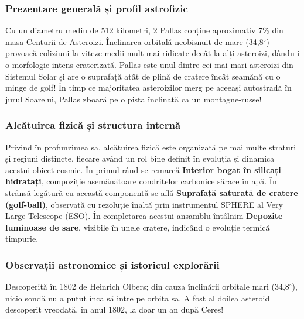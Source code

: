 \subsubsection*{Prezentare generală și profil astrofizic}
Cu un diametru mediu de 512 kilometri, 2 Pallas conține aproximativ 7\% din masa Centurii de Asteroizi. Înclinarea orbitală neobișnuit de mare (34,8$^\circ$) provoacă coliziuni la viteze medii mult mai ridicate decât la alți asteroizi, dându-i o morfologie intens craterizată. Pallas este unul dintre cei mai mari asteroizi din Sistemul Solar și are o suprafață atât de plină de cratere încât seamănă cu o minge de golf! În timp ce majoritatea asteroizilor merg pe aceeași \guillemotleft{}autostradă\guillemotright{} în jurul Soarelui, Pallas zboară pe o pistă înclinată ca un montagne-russe!

\subsubsection*{Alcătuirea fizică și structura internă}
Privind în profunzimea sa, alcătuirea fizică este organizată pe mai multe straturi și regiuni distincte, fiecare având un rol bine definit în evoluția și dinamica acestui obiect cosmic. În primul rând se remarcă \textbf{Interior bogat în silicați hidratați}, compoziție asemănătoare condritelor carbonice sărace în apă. În strânsă legătură cu această componentă se află \textbf{Suprafață saturată de cratere (\guillemotleft{}golf-ball\guillemotright{})}, observată cu rezoluție înaltă prin instrumentul SPHERE al Very Large Telescope (ESO). În completarea acestui ansamblu întâlnim \textbf{Depozite luminoase de sare}, vizibile în unele cratere, indicând o evoluție termică timpurie.

\subsubsection*{Observații astronomice și istoricul explorării}
Descoperită în 1802 de Heinrich Olbers; din cauza înclinării orbitale mari (34,8$^\circ$), nicio sondă nu a putut încă să intre pe orbita sa. A fost al doilea asteroid descoperit vreodată, în anul 1802, la doar un an după Ceres!


